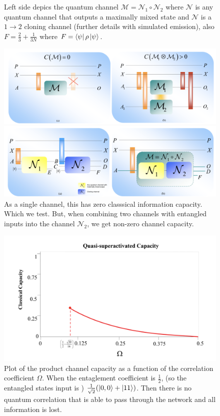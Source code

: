 \documentclass[11pt]{extarticle}	 %
\begin{document}
\begin{flushleft}
\begin{enumerate}
\begin{enumerate}[label=(\Alph*)]
\begin{figure}[h]
\centering
\caption{Left side depics the quantum channel $\mathcal{M} = \mathcal{N}_1 \circ \mathcal{N}_2$ where $\mathcal{N}$ is any quantum channel that outputs a maximally mixed state and $\mathcal{N}$ is a $1 \to 2 $ cloning channel (further details with simulated emission), also $F = \frac{2}{3} + \frac{1}{3N}$ where $F = \bra{\psi} \rho \ket{\psi}$.}
\includegraphics[width=400pt]{first.png}
\caption{As a single channel, this has zero classsical information capacity. Which we test. But, when combining two channels with entangled inputs into the channel $\mathcal{N}_2$, we get non-zero channel capacity.}
\includegraphics[width=400pt]{second.png}
  \end{figure}
\begin{figure}[h]
  \centering
\caption{Plot of the product channel capacity as a function of the correlation coefficient $\Omega$. When the entaglement coefficient is $\frac{1}{2}$, (so the entangled states input is ) $ \frac{1}{\sqrt{2}} (\ket{0,0} + \ket{11})$. Then there is no quantum correlation that is able to pass through the network and all information is lost. }
\includegraphics[width=400pt]{correlation.png}
  \end{figure}





\end{enumerate}


\end{enumerate}
\end{flushleft}
\end{document}
